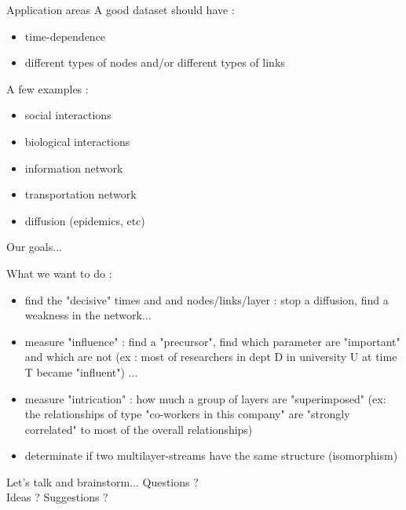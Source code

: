 \documentclass[15pt]{beamer}
\begin{document}
\begin{frame}{Application areas}
A good dataset should have :
\begin{itemize}
    \item time-dependence
    \item different types of nodes and/or different types of links
\end{itemize}
A few examples :
\begin{itemize}
    \item social interactions
    \item biological interactions
    \item information network
    \item transportation network
    \item diffusion (epidemics, etc)
\end{itemize}
\end{frame}
\begin{frame}{Our goals...}

What we want to do : 
\begin{itemize}
    \item find the "decisive" times and and nodes/links/layer : stop a diffusion, find a weakness in the network...
    \item measure "influence" : find a "precursor", find which parameter are "important" and which are not (ex : most of researchers in dept D in university U at time T became "influent") ...
    \item measure "intrication" : how much a group of layers are "superimposed" (ex: the relationships of type "co-workers in this company" are "strongly correlated" to most of the overall relationships)
    \item determinate if two multilayer-streams have the same structure (isomorphism)
\end{itemize}
    
\end{frame}

\begin{frame}{Let's talk and brainstorm...}
    Questions ?
    \\
    Ideas ? Suggestions ?
\end{frame}
\end{document}
